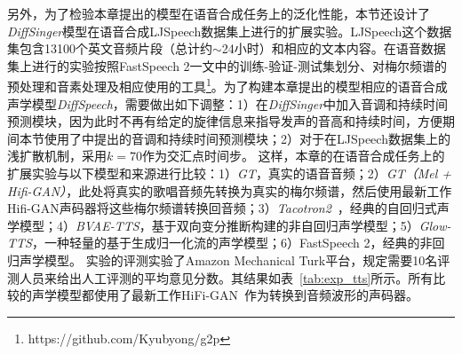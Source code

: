 另外，为了检验本章提出的模型在语音合成任务上的泛化性能，本节还设计了\textit{DiffSinger}模型在语音合成LJSpeech数据集\cite{ljspeech17}上进行的扩展实验。LJSpeech这个数据集包含13100个英文音频片段（总计约$\sim$24小时）和相应的文本内容。在语音数据集上进行的实验按照FastSpeech 2\citep{ren2021fastspeech}一文中的训练-验证-测试集划分、对梅尔频谱的预处理和音素处理及相应使用的工具\footnote{https://github.com/Kyubyong/g2p}。为了构建本章提出的模型相应的语音合成声学模型\textit{DiffSpeech}，需要做出如下调整：1）在\textit{DiffSinger}中加入音调和持续时间预测模块，因为此时不再有给定的旋律信息来指导发声的音高和持续时间，方便期间本节使用了中提出的音调和持续时间预测模块；2）对于在LJSpeech数据集上的浅扩散机制，采用$k=70$作为交汇点时间步。
这样，本章的在语音合成任务上的扩展实验与以下模型和来源进行比较：1）\textit{GT}，真实的语音音频；2）\textit{GT（Mel + Hifi-GAN）}，此处将真实的歌唱音频先转换为真实的梅尔频谱，然后使用最新工作Hifi-GAN声码器将这些梅尔频谱转换回音频；3）\textit{Tacotron2}~\citep{shen2018natural}，经典的自回归式声学模型；4）\textit{BVAE-TTS}\citep{lee2020bidirectional}，基于双向变分推断构建的非自回归声学模型；5）\textit{Glow-TTS}\citep{kim2020glow}，一种轻量的基于生成归一化流的声学模型；6）FastSpeech 2\citep{ren2021fastspeech}，经典的非回归声学模型。
实验的评测实验了Amazon Mechanical Turk平台，规定需要10名评测人员来给出人工评测的平均意见分数。其结果如表~\ref{tab:exp_tts}所示。所有比较的声学模型都使用了最新工作HiFi-GAN~\citep{kong2020hifi}作为转换到音频波形的声码器。
